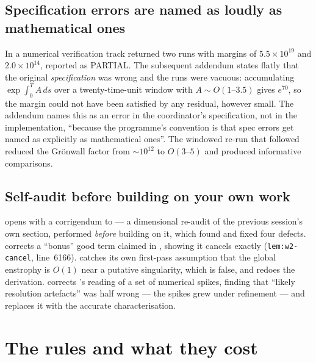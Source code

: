 \subsection{Specification errors are named as loudly as mathematical ones}

In  a numerical verification track returned two runs with margins of
\(5.5\times10^{19}\) and \(2.0\times10^{14}\), reported as \textsf{PARTIAL}.
The subsequent addendum states flatly that the original \emph{specification}
was wrong and the runs were vacuous: accumulating \(\exp\int_0^T A\,ds\) over
a twenty-time-unit window with \(A\sim O(1\text{--}3.5)\) gives \(e^{70}\),
so the margin could not have been satisfied by any residual, however small.
The addendum names this as an error in the coordinator's specification, not in
the implementation, ``because the programme's convention is that spec errors
get named as explicitly as mathematical ones''. The windowed re-run that
followed reduced the Gr\"onwall factor from \(\sim10^{12}\) to \(O(3\text{--}5)\)
and produced informative comparisons.

\subsection{Self-audit before building on your own work}

 opens with a corrigendum to  --- a dimensional re-audit of the
previous session's own section, performed \emph{before} building on it, which
found and fixed four defects.  corrects a ``bonus'' good term claimed in
, showing it cancels exactly (\texttt{lem:w2-cancel}, line~6166).
 catches its own first-pass assumption that the global enstrophy is
\(O(1)\) near a putative singularity, which is false, and redoes the
derivation.  corrects 's reading of a set of numerical spikes,
finding that ``likely resolution artefacts'' was half wrong --- the spikes grew
under refinement --- and replaces it with the accurate characterisation.

\section{The rules and what they cost}
\label{sec:rules-table}


